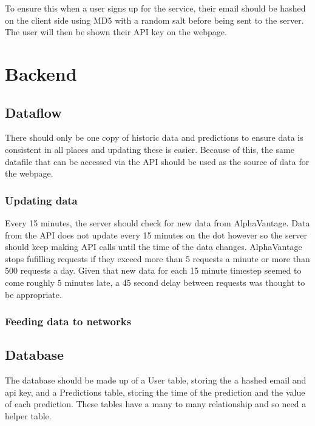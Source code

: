         To ensure this when a user signs up for the service, their email should be hashed on the client side using MD5 with a random salt before being sent to the server. The user will then be shown their API key on the webpage.
    

        
    \section{Backend}

        \subsection{Dataflow}
        There should only be one copy of historic data and predictions to ensure data is consistent in all places and updating these is easier. Because of this, the same datafile that can be accessed via the API should be used as the source of data for the webpage.
            
            \subsubsection{Updating data}
            Every 15 minutes, the server should check for new data from AlphaVantage. Data from the API does not update every 15 minutes on the dot however so the server should keep making API calls until the time of the data changes. AlphaVantage stops fufilling requests if they exceed more than 5 requests a minute or more than 500 requests a day. Given that new data for each 15 minute timestep seemed to come roughly 5 minutes late, a 45 second delay between requests was thought to be appropriate.

            \subsubsection{Feeding data to networks}
            
            
            
        
        \subsection{Database}
        The database should be made up of a User table, storing the a hashed email and api key, and a Predictions table, storing the time of the prediction and the value of each prediction. These tables have a many to many relationship and so need a helper table.
        
